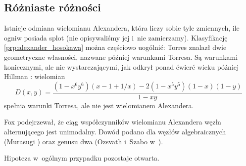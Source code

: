 
\subsection{Różniaste różności}
Istnieje odmiana wielomianu Alexandera, która liczy sobie tyle zmiennych, ile ogniw posiada splot (nie opisywaliśmy jej i~nie zamierzamy).
Klasyfikację \ref{prp:alexander_hosokawa} można częściowo uogólnić: Torres \cite{torres53} znalazł dwie geometryczne własności, nazwane później warunkami Torresa.
%
%
Są warunkami koniecznymi, ale nie wystarczającymi, jak odkrył ponad ćwierć wieku później Hillman \cite{hillman81}: wielomian
%
\begin{equation}
    D(x,y) = \frac{(1 - x^6y^6)(x - 1 + 1/x) - 2(1 - x^5y^5)(1 - x)(1 - y)}{1-xy}
\end{equation}
spełnia warunki Torresa, ale nie jest wielomianem Alexandera.

Fox \cite{fox62} podejrzewał, że ciąg współczynników wielomianu Alexandera węzła alternującego jest unimodalny.
%
%
Dowód podano dla węzłów algebraicznych (Murasugi \cite{murasugi85}) oraz genusu dwa (Ozsvath i~Szabo w~\cite{ozsvath03}).
%
%
%

Hipoteza w~ogólnym przypadku pozostaje otwarta.



